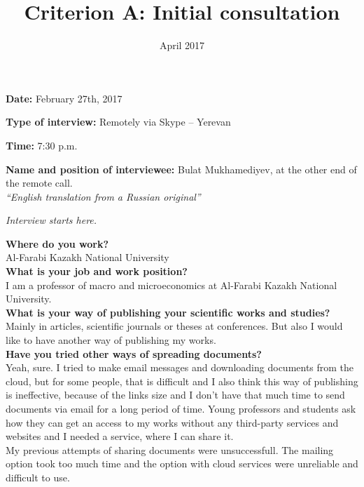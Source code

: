 \documentclass[a4paper]{article}
\title{Criterion A: Initial consultation}
\date{April 2017}
\begin{document}
\maketitle
\textbf{Date:} February 27th, 2017

\textbf{Type of interview:} Remotely via Skype – Yerevan 

\textbf{Time:} 7:30 p.m. 

\textbf{Name and position of interviewee:} Bulat Mukhamediyev, at the other end of the remote call.\\

\textit{“English translation from a Russian original”}\\

\begin{center}
    \textit{Interview starts here.}
\end{center}

\textbf{Where do you work?}\\

Al-Farabi Kazakh National University\\

\textbf{What is your job and work position?}\\

I am a professor of macro and microeconomics at Al-Farabi Kazakh National University.\\

\textbf{What is your way of publishing your scientific works and studies?}\\

Mainly in articles, scientific journals or theses at conferences. But also I would like to have another way of publishing my works.\\

\textbf{Have you tried other ways of spreading documents?}\\

Yeah, sure. I tried to make email messages and downloading documents from the cloud, but for some people, that is difficult and I also think this way of publishing is ineffective, because of the links size and I don’t have that much time to send documents via email for a long period of time. Young professors and students ask how they can get an access to my works without any third-party services and websites and I needed a service, where I can share it.\\

My previous attempts of sharing documents were unsuccessfull. The mailing option took too much time and the option with cloud services were unreliable and difficult to use.\\
\end{document}
